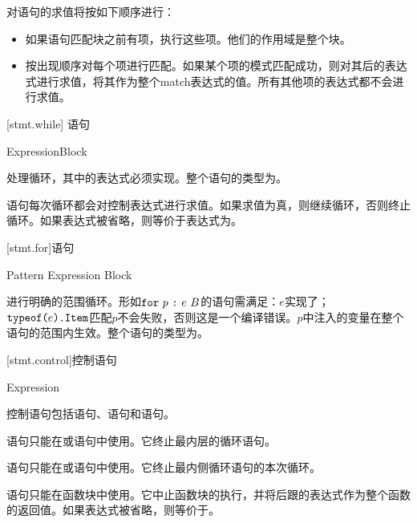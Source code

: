 \pnum
对语句的求值将按如下顺序进行：

\begin{itemize}
    \item 如果语句匹配块之前有项，执行这些项。他们的作用域是整个块。
    \item 按出现顺序对每个项进行匹配。如果某个项的模式匹配成功，则对其后的表达式进行求值，将其作为整个match表达式的值。所有其他项的表达式都不会进行求值。
\end{itemize}

[stmt.while]{ 语句}

\begin{bnf}
 \br
     Expression\bnfq Block
\end{bnf}

\pnum
{}处理循环，其中的表达式必须实现。整个语句的类型为。

\pnum
{}语句每次循环都会对控制表达式进行求值。如果求值为真，则继续循环，否则终止循环。如果表达式被省略，则等价于表达式为。

[stmt.for]{语句}

\begin{bnf}
 \br
     Pattern \terminal{:} Expression Block
\end{bnf}

\pnum
{}进行明确的范围循环。形如$\tcode{for}\ p\ \tcode{:}\ e\ B$的语句需满足：$e$实现了；$\texttt{typeof(}e\texttt{).Item}$匹配$p$不会失败，否则这是一个编译错误。$p$中注入的变量在整个语句的范围内生效。整个语句的类型为。

[stmt.control]{控制语句}

\begin{bnf}
 \br
     \terminal{;}
\end{bnf}

\begin{bnf}
 \br
     \terminal{;}
\end{bnf}

\begin{bnf}
 \br
     Expression\bnfq \terminal{;}
\end{bnf}

\pnum
控制语句包括语句、语句和语句。

\pnum
{}语句只能在或语句中使用。它终止最内层的循环语句。

\pnum
{}语句只能在或语句中使用。它终止最内侧循环语句的本次循环。

\pnum
{}语句只能在函数块中使用。它中止函数块的执行，并将后跟的表达式作为整个函数的返回值。如果表达式被省略，则等价于\tcode{()}。
